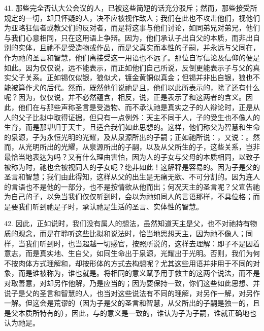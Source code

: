 41. 那些完全否认大公会议的人，已被这些简短的话充分驳斥；然而，那些接受所规定的一切，却只怀疑的人，决不应被视作敌人；我们在此也不攻击他们，视他们为亚略狂信者或教父们的反对者，而是将这事与他们讨论，如同弟兄对弟兄，他们与我们心意相同，只在这用语上争辩。因为，他们承认子出自父的本质，而非出自别的实体，且祂不是受造物或作品，而是父真实而本性的子嗣，并永远与父同在，作为祂的圣言和智慧，他们离接受这一用语也不远了。那位自写信论及信仰的便是如此。因为仅仅说，远不能表示，而正如他们自己所说，反倒更能表示子与父的真实父子关系。正如锡仅似银，狼似犬，镀金黄铜似真金；但锡并非出自银，狼也不能被算作犬的后代。然而，既然他们说祂是且，他们以此所表示的，除了还有什么呢？因为，仅仅说，并不必然蕴含，相反，说，正是表示了和这两者的含义。因此，他们在与那些声称圣言是受造物、而不承认祂是真实之子的人辩论时，正是从人的父子比拟中取得证据，但只有一点例外：天主不同于人，子的受生也不像人的生育，而是那堪归于天主，且适合我们如此思想的。这样，他们称父为智慧和生命的泉源，子为永恒光明的光耀，及从泉源所出的子嗣；正如祂所说：，又说：。然而，从光明所出的光耀，从泉源所出的子嗣，以及从父所生的子，这些关系，岂非最恰当地表达为吗？又有什么理由害怕，因为人的子女与父母的本质相同，以致子被称为时，祂也会被视同人的子女呢？绝非如此！这解释是容易的。因为子是父的圣言和智慧；我们由此得知，这样从父的出生是无痛无欲、不可分割的。因为连人的言语也不是他的一部分，也不是按情欲从他而出；何况天主的圣言呢？父宣告祂为自己的子，以免当我们仅仅听到时，会以为祂如同人的言语那样，不具位格；而是要我们听到祂是子时，承认祂是生活的圣言、实体性的智慧。\par

42. 因此，正如说时，我们没有属人的想法，虽然知道天主是父，也不对祂持有物质的观念，而是在聆听这些比拟和说法时，恰当地思想天主，因为祂不像人；同样，当我们听到时，也当超越一切感官，按照所说的，这样去理解：即子不是因着意志，而是真实地、生自父，如同生命出于泉源，光耀出于光明。否则，我们为何不按肉体方式理解和，却按形体的方式去构想呢？尤其这些用语并非用于不同的对象，而是谁被称为，谁也就是。将相同的意义赋予用于救主的这两个说法，而不是对取善意，对却另作他解，乃是应当的；因为要保持一致，你们这些如此思想、并说子是父的圣言和智慧的人，也当对这些说法有不同的理解，对另作一解，对另作一解。但这会是荒谬的（因为子是父的圣言和智慧，从父所出的子嗣是独一的，且是父本质所特有的），因此，与的意义是一致的，谁认为子为子嗣，谁就正确地也认为祂是。\par

